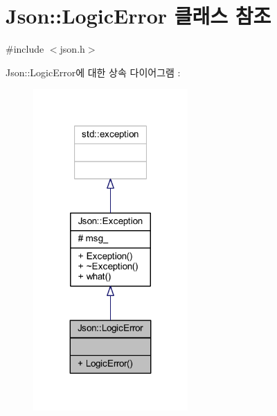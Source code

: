 \hypertarget{class_json_1_1_logic_error}{}\section{Json\+:\+:Logic\+Error 클래스 참조}
\label{class_json_1_1_logic_error}


{\ttfamily \#include $<$json.\+h$>$}



Json\+:\+:Logic\+Error에 대한 상속 다이어그램 \+: \nopagebreak
\begin{figure}[H]
\begin{center}
\leavevmode
\includegraphics[width=167pt]{class_json_1_1_logic_error__inherit__graph}
\end{center}
\end{figure}


